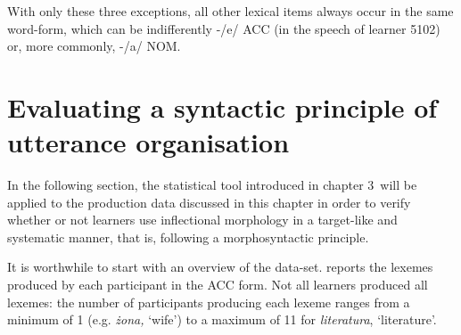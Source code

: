 With only these three exceptions, all other lexical items always occur in the same word-form, which can be indifferently -/e/ ACC (in the speech of learner 5102) or, more commonly, -/a/ NOM. 

\section{Evaluating a syntactic principle of utterance organisation}\label{sec:07:3}

In the following section, the statistical tool introduced in chapter 3~will be applied to the production data discussed in this chapter in order to verify whether or not learners use inflectional morphology in a target-like and systematic manner, that is, following a morphosyntactic principle.  

It is worthwhile to start with an overview of the data-set.  reports the lexemes produced by each participant in the ACC form. Not all learners produced all lexemes: the number of participants producing each lexeme ranges from a minimum of 1 (e.g. \textit{żona,} ‘wife’) to a maximum of 11 for \textit{literatura}, ‘literature’. 

